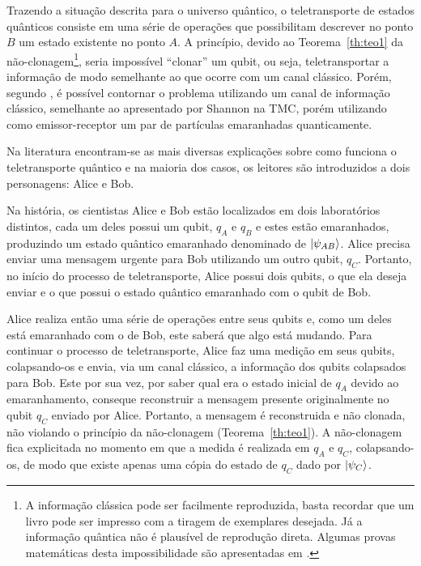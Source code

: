 \documentclass[12pt,oneside,brazil,hidelinks,article,sumario=tradicional,a4paper]{abntex2}
\begin{document}
Trazendo a situação descrita para o universo quântico, o teletransporte de estados quânticos consiste em uma série de operações que possibilitam descrever no ponto \(B\) um estado existente no ponto \(A\). A princípio, devido ao Teorema~\ref{th:teo1} da não-clonagem\footnote{A informação clássica pode ser facilmente reproduzida, basta recordar que um livro pode ser impresso com a tiragem de exemplares desejada. Já a informação quântica não é plausível de reprodução direta. Algumas provas matemáticas desta impossibilidade são apresentadas em \textcite{TeoQuanInfoEntreCopia}.}, seria impossível ``clonar'' um qubit, ou seja, teletransportar a informação de modo semelhante ao que ocorre com um canal clássico. Porém, segundo \textcite{bennet}, é possível contornar o problema utilizando um canal de informação clássico, semelhante ao apresentado por Shannon na TMC, porém utilizando como emissor-receptor um par de partículas emaranhadas quanticamente.

Na literatura encontram-se as mais diversas explicações sobre como funciona o teletransporte quântico \cites{bennet}{experimentalqt}{zeilinger}{brassard1996teleportation}{materialdidaticomecquantica} e na maioria dos casos, os leitores são introduzidos a dois personagens: Alice e Bob.

Na história, os cientistas Alice e Bob estão localizados em dois laboratórios distintos, cada um deles possui um qubit, $q_{A}$ e $q_{B}$ e estes estão emaranhados, produzindo um estado quântico emaranhado denominado de $\ket{\psi_{AB}}$. Alice precisa enviar uma mensagem urgente para Bob utilizando um outro qubit, $q_{C}$. Portanto, no início do processo de teletransporte, Alice possui dois qubits, o que ela deseja enviar e o que possui o estado quântico emaranhado com o qubit de Bob.

Alice realiza então uma série de operações entre seus qubits e, como um deles está emaranhado com o de Bob, este saberá que algo está mudando. Para continuar o processo de teletransporte, Alice faz uma medição em seus qubits, colapsando-os e envia, via um canal clássico, a informação dos qubits colapsados para Bob. Este por sua vez, por saber qual era o estado inicial de $q_{A}$ devido ao emaranhamento, conseque reconstruir a mensagem presente originalmente no qubit $q_{C}$ enviado por Alice. Portanto, a mensagem é reconstruida e não clonada, não violando o princípio da não-clonagem (Teorema~\ref{th:teo1}). A não-clonagem fica explicitada no momento em que a medida é realizada em $q_{A}$ e $q_{C}$, colapsando-os, de modo que existe apenas uma cópia do estado de $q_{C}$ dado por $\ket{\psi_{C}}$.
\end{document}
